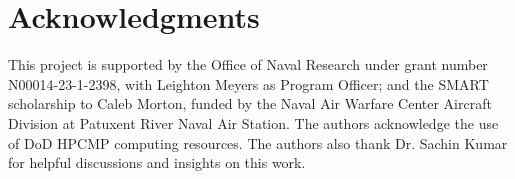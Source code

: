 \documentclass[conf]{new-aiaa}
\begin{document}
\section*{Acknowledgments}
This project is supported by the Office of Naval Research under grant number N00014-23-1-2398, with Leighton Meyers as Program Officer; and the SMART scholarship to Caleb Morton, funded by the Naval Air Warfare Center Aircraft Division at Patuxent River Naval Air Station. The authors acknowledge the use of DoD HPCMP computing resources. The authors also thank Dr. Sachin Kumar for helpful discussions and insights on this work.


\end{document}
